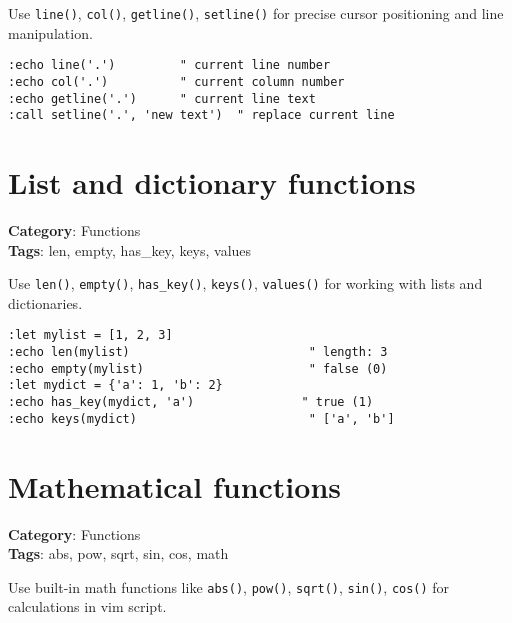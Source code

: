 Use {\footnotesize \Verb§line()§}, {\footnotesize \Verb§col()§}, {\footnotesize \Verb§getline()§}, {\footnotesize \Verb§setline()§} for precise cursor positioning and line manipulation.

\begin{Exa*}{}
\begin{Verbatim}[fontsize=\footnotesize, breaklines, breakanywhere]
:echo line('.')         " current line number
:echo col('.')          " current column number
:echo getline('.')      " current line text
:call setline('.', 'new text')  " replace current line
\end{Verbatim}
\end{Exa*}

\section{List and dictionary functions}

\textbf{Category}: Functions\\ \textbf{Tags}: len, empty, has\_key, keys, values
\vspace{0.5cm}

Use {\footnotesize \Verb§len()§}, {\footnotesize \Verb§empty()§}, {\footnotesize \Verb§has_key()§}, {\footnotesize \Verb§keys()§}, {\footnotesize \Verb§values()§} for working with lists and dictionaries.

\begin{Exa*}{}
\begin{Verbatim}[fontsize=\footnotesize, breaklines, breakanywhere]
:let mylist = [1, 2, 3]
:echo len(mylist)                         " length: 3
:echo empty(mylist)                       " false (0)
:let mydict = {'a': 1, 'b': 2}
:echo has_key(mydict, 'a')               " true (1)
:echo keys(mydict)                        " ['a', 'b']
\end{Verbatim}
\end{Exa*}

\section{Mathematical functions}

\textbf{Category}: Functions\\ \textbf{Tags}: abs, pow, sqrt, sin, cos, math
\vspace{0.5cm}

Use built-in math functions like {\footnotesize \Verb§abs()§}, {\footnotesize \Verb§pow()§}, {\footnotesize \Verb§sqrt()§}, {\footnotesize \Verb§sin()§}, {\footnotesize \Verb§cos()§} for calculations in vim script.

